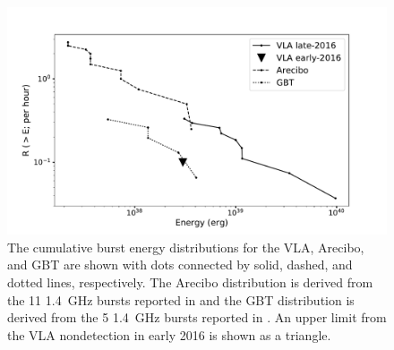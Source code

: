 \documentclass[twocolumn]{aastex61}
\newcommand{\frb}{FRB 121102}
\begin{document}
\begin{figure}[htb]
\begin{center}
\includegraphics[width=0.9\columnwidth]{energy_disn}
\caption{The cumulative burst energy distributions for the VLA, Arecibo, and GBT are shown with dots connected by solid, dashed, and dotted lines, respectively. The Arecibo distribution is derived from the 11 1.4~GHz bursts reported in \citet{2016Natur.531..202S} and the GBT distribution is derived from the 5 1.4~GHz bursts reported in \citet{2016arXiv160308880S}. An upper limit from the VLA nondetection in early 2016 is shown as a triangle. \label{fig:ed}}
\end{center}
\end{figure}

%
%
\end{document}
